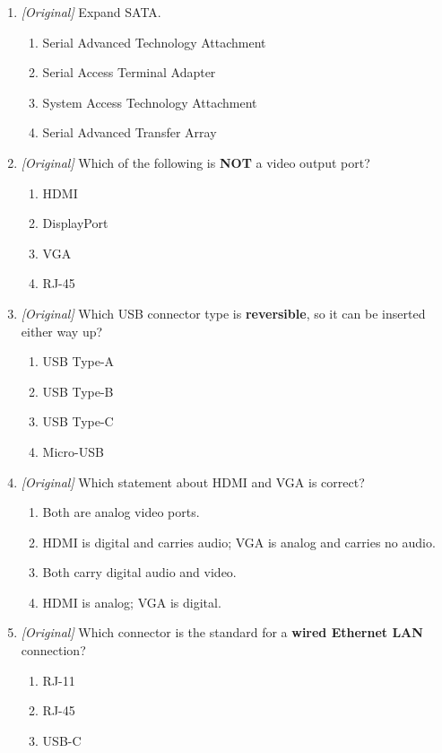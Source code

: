 \documentclass[11pt]{article}
\begin{document}
\begin{enumerate}[label=\textbf{Q\arabic*.}, leftmargin=*]
\begin{enumerate}[label=\Alph*.]
  \end{enumerate}
\item \textit{[Original]} Expand SATA.
  \begin{enumerate}[label=\Alph*.]
    \item Serial Advanced Technology Attachment
    \item Serial Access Terminal Adapter
    \item System Access Technology Attachment
    \item Serial Advanced Transfer Array
  \end{enumerate}
\item \textit{[Original]} Which of the following is \textbf{NOT} a video
  output port?
  \begin{enumerate}[label=\Alph*.]
    \item HDMI
    \item DisplayPort
    \item VGA
    \item RJ-45
  \end{enumerate}
\item \textit{[Original]} Which USB connector type is \textbf{reversible},
  so it can be inserted either way up?
  \begin{enumerate}[label=\Alph*.]
    \item USB Type-A
    \item USB Type-B
    \item USB Type-C
    \item Micro-USB
  \end{enumerate}
\item \textit{[Original]} Which statement about HDMI and VGA is correct?
  \begin{enumerate}[label=\Alph*.]
    \item Both are analog video ports.
    \item HDMI is digital and carries audio; VGA is analog and carries no
      audio.
    \item Both carry digital audio and video.
    \item HDMI is analog; VGA is digital.
  \end{enumerate}
\item \textit{[Original]} Which connector is the standard for a \textbf{wired
  Ethernet LAN} connection?
  \begin{enumerate}[label=\Alph*.]
    \item RJ-11
    \item RJ-45
    \item USB-C

\end{enumerate}
\end{enumerate}
\end{document}
